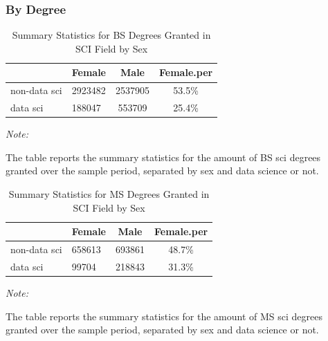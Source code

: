 \documentclass[
  12pt,
]{article}
\begin{document}
\hypertarget{by-degree}{%
\subsubsection{By Degree}\label{by-degree}}

\begin{table}[H]

\caption{\label{tab:unnamed-chunk-13}Summary Statistics for BS Degrees Granted in SCI Field by Sex}
\centering
\begin{threeparttable}
\begin{tabular}[t]{llcc}
\toprule
  & Female & Male & Female.per\\
\midrule
non-data sci & 2923482 & 2537905 & 53.5\%\\
data sci & 188047 & 553709 & 25.4\%\\
\bottomrule
\end{tabular}
\begin{tablenotes}
\item \textit{Note: } 
\item The table reports the summary statistics for the amount of BS sci degrees granted over the sample period, separated by sex and data science or not.
\end{tablenotes}
\end{threeparttable}
\end{table}

\begin{table}[H]

\caption{\label{tab:unnamed-chunk-13}Summary Statistics for MS Degrees Granted in SCI Field by Sex}
\centering
\begin{threeparttable}
\begin{tabular}[t]{llcc}
\toprule
  & Female & Male & Female.per\\
\midrule
non-data sci & 658613 & 693861 & 48.7\%\\
data sci & 99704 & 218843 & 31.3\%\\
\bottomrule
\end{tabular}
\begin{tablenotes}
\item \textit{Note: } 
\item The table reports the summary statistics for the amount of MS sci degrees granted over the sample period, separated by sex and data science or not.
\end{tablenotes}
\end{threeparttable}
\end{table}
\end{document}
